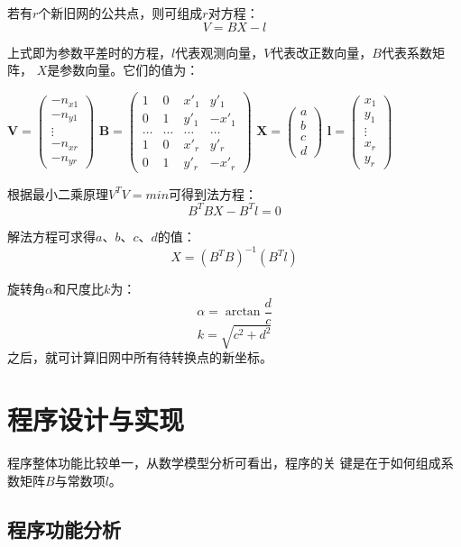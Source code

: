 若有$r$个新旧网的公共点，则可组成$r$对方程：
$$V=BX-l$$

上式即为参数平差时的方程，$l$代表观测向量，$V$代表改正数向量，$B$代表系数矩阵，
$X$是参数向量。它们的值为：

$\mathbf{V}=
\left(\begin{array}{c}
-n_{x1} \\ -n_{y1} \\ \vdots \\ -n_{xr} \\ -n_{yr}
\end{array}\right)$
$\mathbf{B}=
\left(\begin{array}{cccc}
1 & 0 & x'_1 & y'_1 \\
0 & 1 & y'_1 & -x'_1 \\
\dots & \dots & \ldots & \ldots \\
1 & 0 & x'_r & y'_r \\
0 & 1 & y'_r & -x'_r
\end{array}\right)$
$\mathbf{X}=
\left(\begin{array}{c}
a \\ b \\ c \\ d
\end{array}\right)$
$\mathbf{l}=
\left(\begin{array}{c}
x_1 \\ y_1 \\ \vdots \\ x_r \\ y_r
\end{array}\right)$

根据最小二乘原理$V^TV=min$可得到法方程：
$$B^TBX-B^Tl=0$$

解法方程可求得$a$、$b$、$c$、$d$的值：
$$X=(B^TB)^{-1}(B^Tl)$$

旋转角$\alpha$和尺度比$k$为：
$$\alpha=\arctan\frac{d}{c}$$
$$k=\sqrt{c^2+d^2}$$
之后，就可计算旧网中所有待转换点的新坐标。

\section{程序设计与实现}

程序整体功能比较单一，从数学模型分析可看出，程序的关
键是在于如何组成系数矩阵$B$与常数项$l$。

\subsection{程序功能分析}

